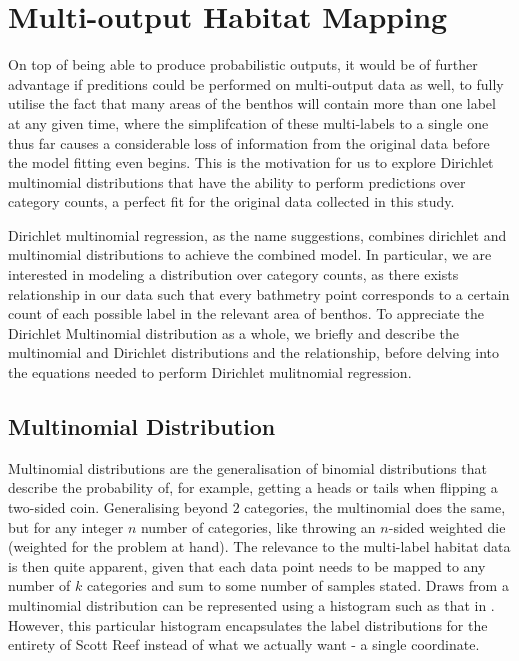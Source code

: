 \chapter{Multi-output Habitat Mapping} \label{chap:dms}
On top of being able to produce probabilistic outputs, it would be of further advantage if preditions could be performed on multi-output data as well, to fully utilise the fact that many areas of the benthos will contain more than one label at any given time, where the simplifcation of these multi-labels to a single one thus far causes a considerable loss of information from the original data before the model fitting even begins. This is the motivation for us to explore Dirichlet multinomial distributions that have the ability to perform predictions over category counts, a perfect fit for the original data collected in this study.

Dirichlet multinomial regression, as the name suggestions, combines dirichlet and multinomial distributions to achieve the combined model. In particular, we are interested in modeling a distribution over category counts, as there exists relationship in our data such that every bathmetry point corresponds to a certain count of each possible label in the relevant area of benthos. To appreciate the Dirichlet Multinomial distribution as a whole, we briefly and describe the multinomial and Dirichlet distributions and the relationship, before delving into the equations needed to perform Dirichlet mulitnomial regression.


\section{Multinomial Distribution}
Multinomial distributions are the generalisation of binomial distributions that describe the probability of, for example, getting a heads or tails when flipping a two-sided coin. Generalising beyond $2$ categories, the multinomial does the same, but for any integer $n$ number of categories, like throwing an $n$-sided weighted die (weighted for the problem at hand). The relevance to the multi-label habitat data is then quite apparent, given that each data point needs to be mapped to any number of $k$ categories and sum to some number of samples stated. Draws from a multinomial distribution can be represented using a histogram such as that in . However, this particular histogram encapsulates the label distributions for the entirety of Scott Reef instead of what we actually want - a single coordinate.

